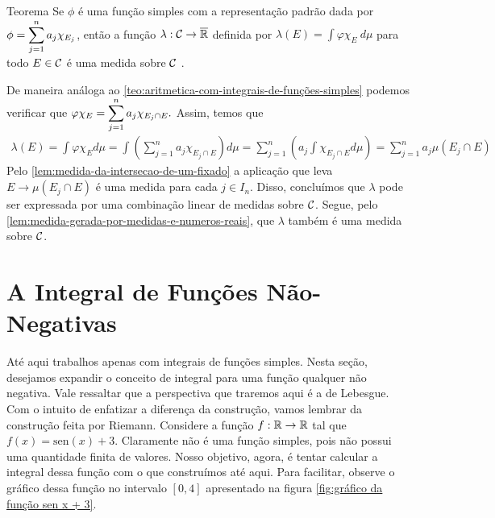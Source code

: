 \begin{env}{Teorema}
	\label{teo:medida-atraves-de-uma-integral}
	Se $\phi$ é uma função simples com  a representação padrão dada por $\phi = \displaystyle \sum_{j = 1}^n a_j\chi_{E_j}$, então a função $\lambda: \operatorname{\mathcal{C}} \to \operatorname{\overline{\mathbb{R}}}$ definida por
	$
	\displaystyle\lambda(E) = \int \varphi\chi_E\ d\mu
	$
	para todo $E \in \operatorname{\mathcal{C}}$ é uma medida sobre $\operatorname{\mathcal{C}}$
	\cite{bartle}. 
\end{env}

\begin{prova}
	De maneira análoga ao  \ref{teo:aritmetica-com-integrais-de-funções-simples}
	podemos verificar que 
	$
	\varphi\chi_E = \displaystyle \sum_{j = 1}^n a_j\chi_{E_j \cap E}.
	$
	Assim, temos que 
	\begin{align*}
		\lambda(E) 
		= \int \varphi\chi_E d\mu
		= \int\left(\sum_{j = 1}^n a_j\chi_{E_j \cap E}\right)d\mu
		= \sum_{j = 1}^n\left(a_j\int \chi_{E_j \cap E}d\mu\right) 
		= \sum_{j = 1}^n a_j\mu(E_j\cap E)
	\end{align*}
	Pelo  \ref{lem:medida-da-intersecao-de-um-fixado} a aplicação que leva 
	$E \to \mu(E_j\cap E)$ é uma medida para cada $j \in I_n$.
	Disso, concluímos que $\lambda$ pode ser expressada por uma combinação linear de medidas sobre $\operatorname{\mathcal{C}}$.
	Segue, pelo  \ref{lem:medida-gerada-por-medidas-e-numeros-reais}, que 
	$\lambda$ também é uma medida sobre $\operatorname{\mathcal{C}}$.
\end{prova}

\section{A Integral de Funções Não-Negativas}

Até aqui trabalhos apenas com integrais de funções simples.
Nesta seção, desejamos expandir o conceito de integral para uma função qualquer não negativa.
Vale ressaltar que a perspectiva que traremos aqui é a de Lebesgue.
Com o intuito de enfatizar a diferença da construção, vamos lembrar da construção feita por Riemann.
Considere a função $f: \mathbb{R} \to \mathbb{R}$ tal que $f(x) = \mathrm{sen}(x) + 3$.
Claramente não é uma função simples, pois não possui uma quantidade finita de valores. 
Nosso objetivo, agora, é tentar calcular a integral dessa função com o que construímos até aqui.
Para facilitar, observe o gráfico dessa função no intervalo $[0,4]$ apresentado na figura \ref{fig:gráfico da função sen x + 3}.

